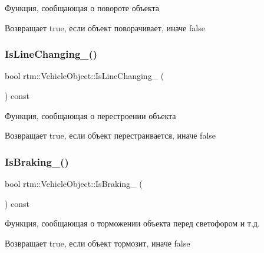 Функция, сообщающая о повороте объекта 

\begin{DoxyReturn}{Возвращает}
true, если объект поворачивает, иначе false 
\end{DoxyReturn}
\mbox{\label{classrtm_1_1_vehicle_object_a464c8de22beb3cbf819d12ad36ae4974}} 
\subsubsection{\texorpdfstring{Is\+Line\+Changing\+\_\+()}{IsLineChanging\_()}}
{\footnotesize\ttfamily bool rtm\+::\+Vehicle\+Object\+::\+Is\+Line\+Changing\+\_\+ (\begin{DoxyParamCaption}{ }\end{DoxyParamCaption}) const\hspace{0.3cm}{\ttfamily [protected]}}



Функция, сообщающая о перестроении объекта 

\begin{DoxyReturn}{Возвращает}
true, если объект перестраивается, иначе false 
\end{DoxyReturn}
\mbox{\label{classrtm_1_1_vehicle_object_ab74eb10fd7df8238a437923cbf184bca}} 
\subsubsection{\texorpdfstring{Is\+Braking\+\_\+()}{IsBraking\_()}}
{\footnotesize\ttfamily bool rtm\+::\+Vehicle\+Object\+::\+Is\+Braking\+\_\+ (\begin{DoxyParamCaption}{ }\end{DoxyParamCaption}) const\hspace{0.3cm}{\ttfamily [protected]}}



Функция, сообщающая о торможении объекта перед светофором и т.\+д. 

\begin{DoxyReturn}{Возвращает}
true, если объект тормозит, иначе false 
\end{DoxyReturn}
\mbox{\label{classrtm_1_1_vehicle_object_ad0dd345b8c1d7913034aaf3267ee4a03}} 
